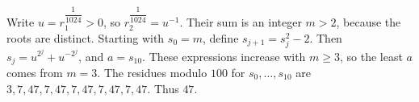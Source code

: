 Write $u=r_1^{\dfrac{1}{1024}}>0$, so $r_2^{\dfrac{1}{1024}}=u^{-1}$. Their sum is an integer $m>2$, because the roots are distinct. Starting with $s_0=m$, define $s_{j+1}=s_j^2-2$. Then $s_j=u^{2^j}+u^{-2^j}$, and $a=s_{10}$. These expressions increase with $m\ge3$, so the least $a$ comes from $m=3$. The residues modulo $100$ for $s_0,\ldots,s_{10}$ are $3,7,47,7,47,7,47,7,47,7,47$. Thus $\boxed{47}$.
